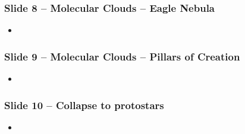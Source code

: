 \documentclass{beamer}
\begin{document}
\begin{frame}
 \frametitle{Slide 8 -- Molecular Clouds -- Eagle Nebula}
 \begin{itemize}
   \item
 \end{itemize}
\end{frame}
\begin{frame}
 \frametitle{Slide 9 -- Molecular Clouds -- Pillars of Creation}
 \begin{itemize}
   \item
 \end{itemize}
\end{frame}
\begin{frame}
 \frametitle{Slide 10 -- Collapse to protostars}
 \begin{itemize}
   \item
 \end{itemize}
\end{frame}
\end{document}
